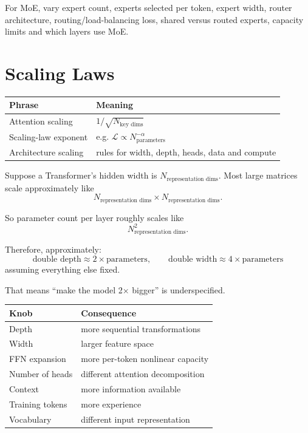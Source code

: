\begin{calloutdegreeofexperiment}
For MoE, vary expert count, experts selected per token, expert width, router architecture, routing/load-balancing loss, shared versus routed experts, capacity limits and which layers use MoE.
\end{calloutdegreeofexperiment}




\section{Scaling Laws}
\begin{center}
\small
\begin{tabularx}{.90\linewidth}{@{}L{.28\linewidth}Y@{}}
\toprule
\textbf{Phrase} & \textbf{Meaning} \\
\midrule
Attention scaling & $1/\sqrt{N_{\text{key dims}}}$ \\
Scaling-law exponent & e.g. $\mathcal L\propto N_{\text{parameters}}^{-\alpha}$ \\
Architecture scaling & rules for width, depth, heads, data and compute \\
\bottomrule
\end{tabularx}
\end{center}
Suppose a Transformer's hidden width is $N_{\text{representation dims}}$.
Most large matrices scale approximately like
\[
N_{\text{representation dims}}
\times
N_{\text{representation dims}}.
\]

So parameter count per layer roughly scales like
\[
N_{\text{representation dims}}^2.
\]

Therefore, approximately:
\[
\boxed{
\text{double depth}\approx2\times\text{parameters},
\qquad
\text{double width}\approx4\times\text{parameters}
}
\]
assuming everything else fixed.

That means ``make the model 2$\times$ bigger'' is underspecified.

\begin{center}
\small
\begin{tabularx}{.88\linewidth}{@{}L{.28\linewidth}Y@{}}
\toprule
\textbf{Knob} & \textbf{Consequence} \\
\midrule
Depth & more sequential transformations \\
Width & larger feature space \\
FFN expansion & more per-token nonlinear capacity \\
Number of heads & different attention decomposition \\
Context & more information available \\
Training tokens & more experience \\
Vocabulary & different input representation \\
\bottomrule
\end{tabularx}
\end{center}

